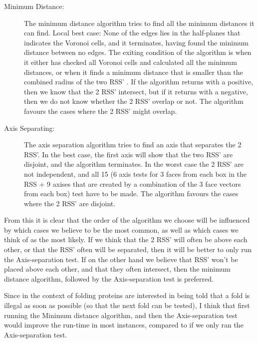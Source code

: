 \begin{description}
\item[Minimum Distance:] The minimum distance algorithm tries to find all the minimum distances it can find. 
Local best case: None of the edges lies in the half-planes that indicates the  Voronoi cells, and it terminates, having found the minimum distance between no edges. The exiting condition of the algorithm is when it either has checked all Voronoi cells  and calculated all the minimum distances, or when it finds a minimum distance that is smaller than the combined radius of the two RSS' . If the algorithm returns with a positive, then we know that the 2 RSS' intersect, but if it returns with a negative, then we do not know whether the 2 RSS' overlap or not. The algorithm favours the cases where the 2 RSS' might overlap.  

\item[Axis Separating:] The axis separation algorithm tries to find an axis that separates the 2 RSS'. In the best case, the first axis will show that the two RSS' are disjoint, and the algorithm terminates. In the worst case the 2 RSS' are not independent, and all 15 (6 axis tests for 3 faces from each box in the RSS  + 9 axises that are created by a combination of the 3 face vectors from each box) test have to be made. The algorithm favours the cases where the 2 RSS' are disjoint.
\end{description}

From this it is clear that the order of the algorithm we choose will be influenced by which cases we believe to be the most common, as well as which cases we think of as the most likely. If we think that the 2 RSS' will often be above each other, or that the RSS' often will be separated, then it will be better to only run the Axis-separation test. If on the other hand we believe that RSS' won't be placed above each other, and that they often intersect, then the minimum distance algorithm, followed by the Axis-separation test is preferred.

Since in the context of folding proteins are interested in being told that a fold is illegal as soon as possible (so that the next fold can be tested), I think that first running the Minimum distance algorithm, and then the Axis-separation test would improve the run-time in most instances, compared to if we only ran the Axis-separation test.


